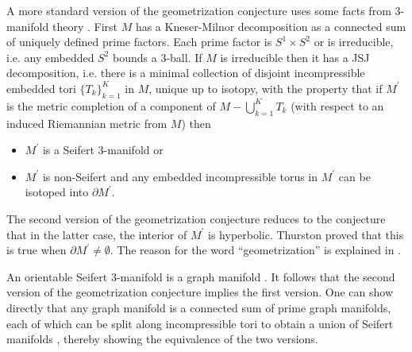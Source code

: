 \documentclass[12pt]{amsart}
\numberwithin{equation}{section}
\theoremstyle{plain}
\theoremstyle{definition}
\theoremstyle{remark}
\begin{document}
A more standard version of the geometrization conjecture uses
some facts from $3$-manifold theory
\cite{Scott}. First $M$ has a Kneser-Milnor decomposition as
a connected sum of uniquely defined prime factors. Each prime factor is
$S^1 \times S^2$ or is irreducible, i.e. any embedded $S^2$ bounds
a $3$-ball. If $M$ is irreducible then it has a JSJ decomposition, i.e.
there is a minimal collection
of disjoint incompressible 
embedded tori $\{T_k\}_{k=1}^K$ in $M$, unique up
to isotopy, with the property that
if $M^\prime$ is the metric completion of a component of 
$M - \bigcup_{k=1}^K T_k$ (with respect to an induced 
Riemannian metric from $M$) then
\begin{itemize}
\item $M^\prime$ is a Seifert $3$-manifold or
\item $M^\prime$ is non-Seifert and any embedded incompressible torus in
$M^\prime$ can be isotoped into $\partial M^\prime$.
\end{itemize}
The second version of the geometrization conjecture reduces to
the conjecture that in the latter case, the interior
of $M^\prime$ is hyperbolic. Thurston proved that this is true when
$\partial M^\prime \neq \emptyset$.
The reason for the word ``geometrization''
is explained in \cite{Scott,Thurston}.

An orientable Seifert $3$-manifold is a graph manifold
\cite[Proposition 2.4.2]{Matveev}. It follows that
the second version of the geometrization conjecture implies the
first version. One can show directly that any graph manifold
is a connected sum of prime graph manifolds, each of which can be split
along incompressible tori to
obtain a union of Seifert manifolds \cite[Proposition 2.4.7]{Matveev},
thereby showing the equivalence of the two versions.
\end{document}
